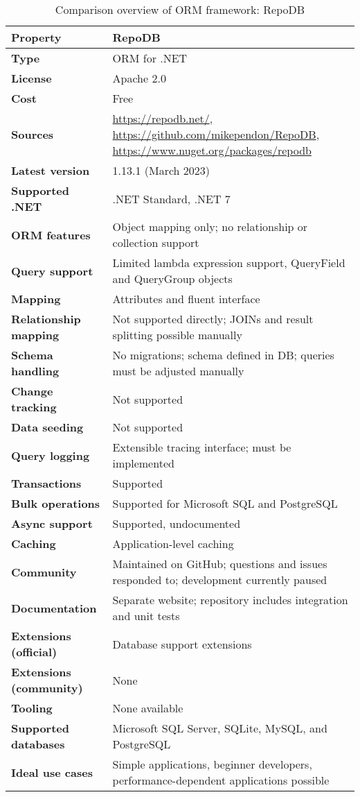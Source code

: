 \begin{table}[H]
\centering
\caption{Comparison overview of ORM framework: RepoDB}
\begin{tabular}{|l|l|}
\toprule
\textbf{Property} & \textbf{RepoDB} \\
\midrule
\textbf{Type} & ORM for .NET \\
\textbf{License} & Apache 2.0 \\
\textbf{Cost} & Free \\
\textbf{Sources} & \url{https://repodb.net/}, \url{https://github.com/mikependon/RepoDB}, \url{https://www.nuget.org/packages/repodb}  \\
\textbf{Latest version} & 1.13.1  (March 2023) \\
\textbf{Supported .NET} & .NET Standard, .NET 7 \\
\textbf{ORM features} & Object mapping only; no relationship or collection support \\
\textbf{Query support} & Limited lambda expression support, QueryField and QueryGroup objects \\
\textbf{Mapping} & Attributes and fluent interface \\
\textbf{Relationship mapping} & Not supported directly; JOINs and result splitting possible manually \\
\textbf{Schema handling} & No migrations; schema defined in DB; queries must be adjusted manually \\
\textbf{Change tracking} & Not supported \\
\textbf{Data seeding} & Not supported \\
\textbf{Query logging} & Extensible tracing interface; must be implemented \\
\textbf{Transactions} & Supported \\
\textbf{Bulk operations} & Supported for Microsoft SQL and PostgreSQL \\
\textbf{Async support} & Supported, undocumented \\
\textbf{Caching} & Application-level caching \\
\textbf{Community} & Maintained on GitHub; questions and issues responded to; development currently paused \\
\textbf{Documentation} & Separate website; repository includes integration and unit tests\\
\textbf{Extensions (official)} & Database support extensions \\
\textbf{Extensions (community)} & None \\
\textbf{Tooling} & None available \\
\textbf{Supported databases} & Microsoft SQL Server, SQLite, MySQL, and PostgreSQL \\
\textbf{Ideal use cases} & Simple applications, beginner developers, performance-dependent applications possible \\
\bottomrule
\end{tabular}
\end{table}


